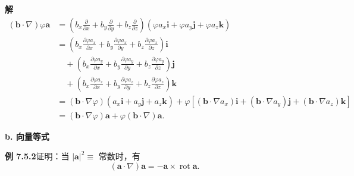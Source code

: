 \documentclass[UTF8, 12pt, fontset=fandol, oneside]{ctexart}
\begin{document}
\noindent\textbf{解}\quad
\[
\begin{aligned}
(\mathbf b\cdot\nabla)\varphi\mathbf a
&=\left(b_x\frac\partial{\partial x}+b_y\frac\partial{\partial y}+b_z\frac\partial{\partial z}\right)
(\varphi a_x\mathbf i+\varphi a_y\mathbf j+\varphi a_z\mathbf k)\\
&=\left(b_x\frac{\partial\varphi a_x}{\partial x}+b_y\frac{\partial\varphi a_x}{\partial y}+b_z\frac{\partial\varphi a_x}{\partial z}\right)\mathbf i\\
&\quad+\left(b_x\frac{\partial\varphi a_y}{\partial x}+b_y\frac{\partial\varphi a_y}{\partial y}+b_z\frac{\partial\varphi a_y}{\partial z}\right)\mathbf j\\
&\quad+\left(b_x\frac{\partial\varphi a_z}{\partial x}+b_y\frac{\partial\varphi a_z}{\partial y}+b_z\frac{\partial\varphi a_z}{\partial z}\right)\mathbf k\\
&=(\mathbf b\cdot\nabla\varphi)(a_x\mathbf i+a_y\mathbf j+a_z\mathbf k)
+\varphi[(\mathbf b\cdot\nabla a_x)\mathbf i+(\mathbf b\cdot\nabla a_y)\mathbf j+(\mathbf b\cdot\nabla a_z)\mathbf k]\\
&=(\mathbf b\cdot\nabla\varphi)\mathbf a+\varphi(\mathbf b\cdot\nabla)\mathbf a.
\end{aligned}
\]

\noindent\textbf{b. 向量等式}

\noindent\textbf{例 7.5.2}\quad 证明：当 $|\mathbf a|^2\equiv$ 常数时，有
\[
(\mathbf a\cdot\nabla)\mathbf a=-\mathbf a\times\operatorname{rot}\mathbf a. \tag{1}
\]
\end{document}

